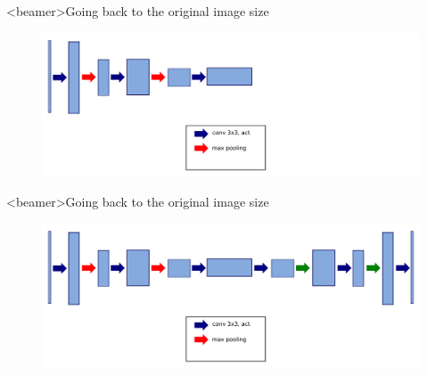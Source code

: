 \documentclass[xcolor=pdftex,dvipsnames,table,mathserif]{beamer}
\begin{document}


\begin{frame}<beamer>{Going back to the original image size}

    \begin{figure}
      \includegraphics[width=\textwidth]{going_back1.png}
    \end{figure}

\end{frame}


\begin{frame}<beamer>{Going back to the original image size}

    \begin{figure}
      \includegraphics[width=\textwidth]{going_back2.png}
    \end{figure}

\end{frame}
\end{document}
